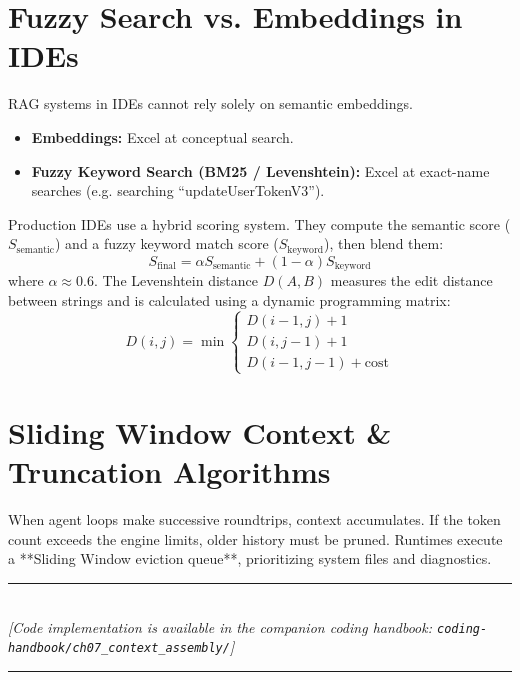 \section{Fuzzy Search vs. Embeddings in IDEs}

RAG systems in IDEs cannot rely solely on semantic embeddings.
\begin{itemize}
    \item \textbf{Embeddings:} Excel at conceptual search.
    \item \textbf{Fuzzy Keyword Search (BM25 / Levenshtein):} Excel at exact-name searches (e.g. searching ``updateUserTokenV3'').
\end{itemize}

Production IDEs use a hybrid scoring system. They compute the semantic score ($S_{\text{semantic}}$) and a fuzzy keyword match score ($S_{\text{keyword}}$), then blend them:
\begin{equation}
S_{\text{final}} = \alpha S_{\text{semantic}} + (1 - \alpha) S_{\text{keyword}}
\end{equation}
where $\alpha \approx 0.6$. The Levenshtein distance $D(A,B)$ measures the edit distance between strings and is calculated using a dynamic programming matrix:
\begin{equation}
D(i,j) = \min \begin{cases}
  D(i-1, j) + 1 \\
  D(i, j-1) + 1 \\
  D(i-1, j-1) + \text{cost}
\end{cases}
\end{equation}

\section{Sliding Window Context \& Truncation Algorithms}

When agent loops make successive roundtrips, context accumulates. If the token count exceeds the engine limits, older history must be pruned. Runtimes execute a **Sliding Window eviction queue**, prioritizing system files and diagnostics.


\begin{center}
\noindent\rule{0.6\textwidth}{0.4pt} \\
\vspace{0.3em}
\textit{[Code implementation is available in the companion coding handbook: \texttt{coding-handbook/ch07\_context\_assembly/}]} \\
\noindent\rule{0.6\textwidth}{0.4pt}
\end{center}


